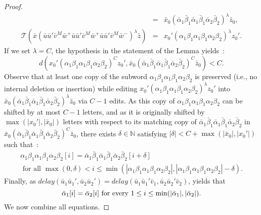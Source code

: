 \documentclass[a4paper,UKenglish,cleveref, autoref, thm-restate,authorcolumns, colorlinks]{lipics-v2021}
\newcommand\delay{\mathit{delay}}
\newcommand{\trans}{\mathcal{T}}
\begin{document}
\begin{proof}
\[\begin{array}{lllllll}
& = & \bar{x}_0(\bar{\alpha}_1\bar{\beta}_1\bar{\alpha}_1\bar{\beta}_1\bar{\alpha}_2\bar{\beta}_2)^\lambda\bar{z}_0,\\
\trans(\bar{x}(\bar{u}\bar{u}'\bar{v}^M\bar{w}^+\bar{u}\bar{u}'\bar{v}^M\bar{w}^+\bar{u}\bar{u}'\bar{v}^M\bar{w}^-)^\lambda\bar{z})
& = & x_0'(\alpha_1\beta_1\alpha_1\beta_1\alpha_2\beta_2)^\lambda z_0'.
\end{array}
\]
If we set $\lambda = C$, 
the hypothesis in the statement of the Lemma yields~: 
\[
d(x_0'(\alpha_1\beta_1\alpha_1\beta_1\alpha_2\beta_2)^C z_0',\bar{x}_0(\bar{\alpha}_1\bar{\beta}_1\bar{\alpha}_1\bar{\beta}_1\bar{\alpha}_2\bar{\beta}_2)^C\bar{z}_0) < C.
\]
Observe that at least one copy of the subword $\alpha_1\beta_1\alpha_1\beta_1\alpha_2\beta_2$
is preserved (i.e., no internal deletion or insertion) while editing
$x_0'(\alpha_1\beta_1\alpha_1\beta_1\alpha_2\beta_2)^\lambda z_0'$ into $\bar{x}_0(\bar{\alpha}_1\bar{\beta}_1\bar{\alpha}_1\bar{\beta}_1\bar{\alpha}_2\bar{\beta}_2)^\lambda\bar{z}_0$
via $C-1$ edits.
As this copy of $\alpha_1\beta_1\alpha_1\beta_1\alpha_2\beta_2$ can be shifted by at most
$C - 1$ letters, and as it is originally shifted by
$\max(|x_0' |,|\bar{x}_0|)$ letters with respect to 
its matching copy of $\bar{\alpha}_1 \bar{\beta}_1 \bar{\alpha}_1 \bar{\beta}_1 \bar{\alpha}_2 \bar{\beta}_2$
in $\bar{x}_0(\bar{\alpha}_1\bar{\beta}_1\bar{\alpha}_1\bar{\beta}_1\bar{\alpha}_2\bar{\beta}_2)^C\bar{z}_0$,
there exists
$\delta \in \mathbb{N}$ satisfying $|\delta| < C + \max(|\bar{x}_0|,|x_0'|)$ such that~:
\begin{equation}\label{equ:pre}
\begin{array}{l}
    \alpha_1 \beta_1 \alpha_1 \beta_1 \alpha_2 \beta_2[i]
      =
    \bar{\alpha}_1 \bar{\beta}_1 \bar{\alpha}_1 \bar{\beta}_1 \bar{\alpha}_2 \bar{\beta}_2[i + \delta]\\
    \text{ for all $\max(0,\delta) < i \leq
    \min(|\alpha_1 \beta_1 \alpha_1 \beta_1 \alpha_2 \beta_2|,
    |\alpha_1 \beta_1 \alpha_1 \beta_1 \alpha_2 \beta_2|-\delta)$.}
\end{array}
\end{equation}
Finally, as $\delay(\bar{u}_1\bar{u}_1',\bar{u}_2\bar{u}_2') = \delay(\bar{u}_1\bar{u}_1'\bar{v}_1,\bar{u}_2\bar{u}_2'\bar{v}_2)$,
 yields that
\begin{equation}\label{equ:STP}
    \bar{\alpha}_1[i] = \bar{\alpha}_2[i]
    \textup{ for every $1 \leq i \leq \min(|\bar{\alpha}_1|,|\bar{\alpha}_2|)$}.
\end{equation}
We now combine all equations.

\end{proof}
\end{document}
